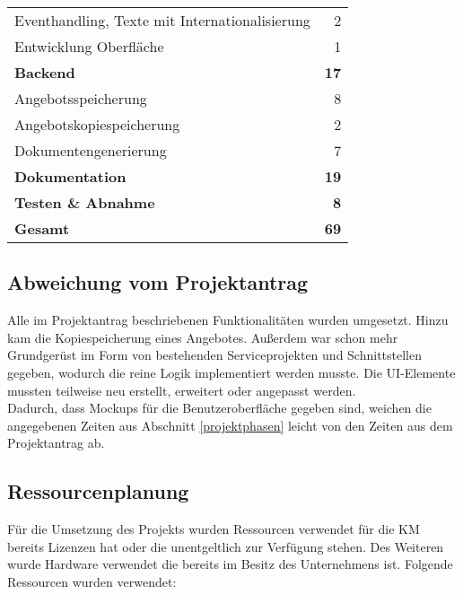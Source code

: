 {\begin{tabular}{|l|r|}
	Eventhandling, Texte mit Internationalisierung            &                        2 \\
		Entwicklung Oberfläche                                    &                        1 \\
	\textbf{Backend  }                                        &             \textbf{ 17} \\
	Angebotsspeicherung                                       &                        8 \\
	Angebotskopiespeicherung                                  &                        2 \\
	Dokumentengenerierung                                     &                        7 \\
	\textbf{Dokumentation }                                   &             \textbf{ 19} \\
	\textbf{Testen \& Abnahme }                               &              \textbf{ 8} \\ \hline
	\textbf{	Gesamt    }                                      &             \textbf{ 69} \\ \hline
\end{tabular}


\subsection{Abweichung vom Projektantrag}
\label{abweichung}
Alle im Projektantrag beschriebenen Funktionalitäten wurden umgesetzt. Hinzu kam die Kopiespeicherung eines Angebotes. Außerdem war schon mehr Grundgerüst im Form von bestehenden Serviceprojekten und Schnittstellen gegeben, wodurch die reine Logik implementiert werden musste. Die UI-Elemente mussten teilweise neu erstellt, erweitert oder angepasst werden.\\
Dadurch, dass Mockups für die Benutzeroberfläche gegeben sind, weichen die angegebenen Zeiten aus Abschnitt \ref{projektphasen} leicht von den Zeiten aus dem Projektantrag ab.
\subsection{Ressourcenplanung}
\label{ressourcenplanung}
Für die Umsetzung des Projekts wurden Ressourcen verwendet für die \ac{KM} bereits Lizenzen hat oder die unentgeltlich zur Verfügung stehen. Des Weiteren wurde Hardware verwendet die bereits im Besitz des Unternehmens ist.
Folgende Ressourcen wurden verwendet:

}
